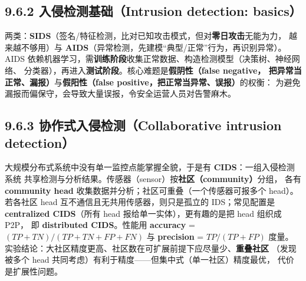 \begin{closeread}
\end{closeread}


\subsection*{9.6.2 入侵检测基础（Intrusion detection: basics）}
两类：\textbf{SIDS}（签名/特征检测，比对已知攻击模式，但对\textbf{零日攻击}无能为力，
越来越不够用）与 \textbf{AIDS}（异常检测，先建模“典型/正常”行为，再识别异常）。
AIDS 依赖机器学习，需\textbf{训练阶段}收集正常数据、构造检测模型（决策树、神经网络、
分类器），再进入\textbf{测试阶段}。核心难题是\textbf{假阴性（false negative，
把异常当正常、漏报）}与\textbf{假阳性（false positive，把正常当异常、误报）}的权衡：
为避免漏报而偏保守，会导致大量误报，令安全运营人员对告警麻木。

\begin{closeread}
\end{closeread}


\subsection*{9.6.3 协作式入侵检测（Collaborative intrusion detection）}
大规模分布式系统中没有单一监控点能掌握全貌，于是有 \textbf{CIDS}：一组入侵检测系统
共享检测与分析结果。传感器（sensor）按\textbf{社区（community）}分组，
各有 \textbf{community head} 收集数据并分析；社区可重叠（一个传感器可报多个 head）。
若各社区 head 互不通信且无共用传感器，则只是孤立的 IDS；常见配置是
\textbf{centralized CIDS}（所有 head 报给单一实体），更有趣的是把 head 组织成 P2P，
即 \textbf{distributed CIDS}。性能用 \textbf{accuracy} =
$(TP+TN)/(TP+TN+FP+FN)$ 与 \textbf{precision} = $TP/(TP+FP)$ 度量。
实验结论：大社区精度更高、社区数在可扩展前提下应尽量少、\textbf{重叠社区}
（发现被多个 head 共同考虑）有利于精度——但集中式（单一社区）精度最优，
代价是扩展性问题。

